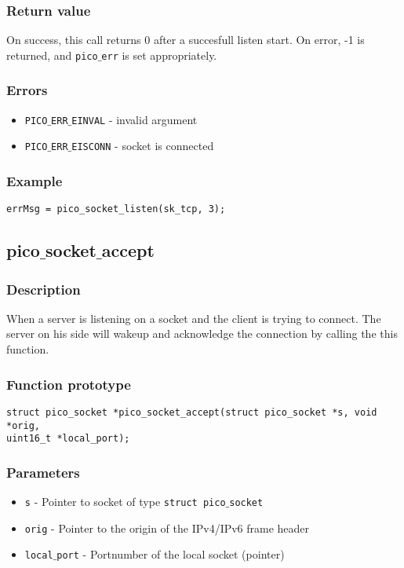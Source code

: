 \subsubsection*{Return value}
On success, this call returns 0 after a succesfull listen start.
On error, -1 is returned, and \texttt{pico$\_$err} is set appropriately. 

\subsubsection*{Errors}
\begin{itemize}[noitemsep]
\item \texttt{PICO$\_$ERR$\_$EINVAL} - invalid argument
\item \texttt{PICO$\_$ERR$\_$EISCONN} - socket is connected
\end{itemize}

\subsubsection*{Example}
\begin{verbatim}
errMsg = pico_socket_listen(sk_tcp, 3);
\end{verbatim}


\subsection{pico$\_$socket$\_$accept}

\subsubsection*{Description}
When a server is listening on a socket and the client is trying to connect.
The server on his side will wakeup and acknowledge the connection by calling the this function.

\subsubsection*{Function prototype}
\begin{verbatim}
struct pico_socket *pico_socket_accept(struct pico_socket *s, void *orig,
uint16_t *local_port);
\end{verbatim}

\subsubsection*{Parameters}
\begin{itemize}[noitemsep]
\item \texttt{s} - Pointer to socket of type \texttt{struct pico$\_$socket}
\item \texttt{orig} - Pointer to the origin of the IPv4/IPv6 frame header
\item \texttt{local$\_$port} - Portnumber of the local socket (pointer)
\end{itemize}

